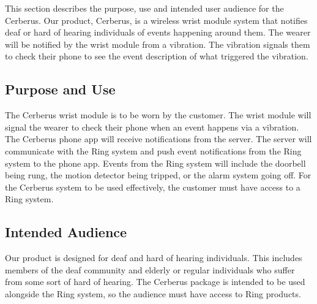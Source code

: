 This section describes the purpose, use and intended user audience for the Cerberus. Our product, Cerberus, is a wireless wrist module system that notifies deaf or hard of hearing individuals of events happening around them. The wearer will be notified by the wrist module from a vibration. The vibration signals them to check their phone to see the event description of what triggered the vibration. 

\subsection{Purpose and Use}
The Cerberus wrist module is to be worn by the customer. The wrist module will signal the wearer to check their phone when an event happens via a vibration. The Cerberus phone app will receive notifications from the server. The server will communicate with the Ring system and push event notifications from the Ring system to the phone app. Events from the Ring system will include the doorbell being rung, the motion detector being tripped, or the alarm system going off. For the Cerberus system to be used effectively, the customer must have access to a Ring system. 

\subsection{Intended Audience}
Our product is designed for deaf and hard of hearing individuals. This includes members of the deaf community and elderly or regular individuals who suffer from some sort of hard of hearing. The Cerberus package is intended to be used alongside the Ring system, so the audience must have access to Ring products.


